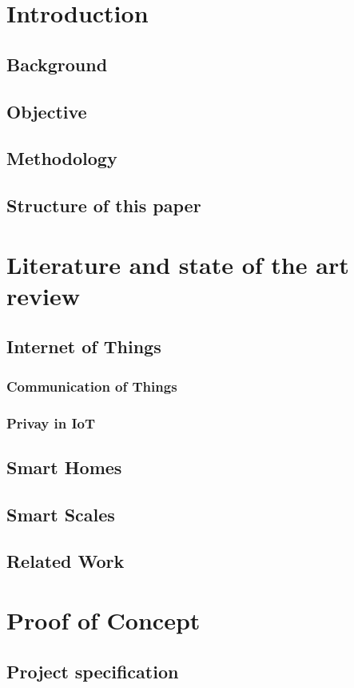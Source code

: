 \documentclass[
12pt,        %
openright,   %
twoside,     %
a4paper,     %
brazil,       %
english       %
%
%
]{ppgca}
\begin{document}
\chapter{Introduction} %
\section{Background}
\section{Objective}
\section{Methodology}
\section{Structure of this paper}


\chapter{Literature and state of the art review}
\section{Internet of Things}
\subsection{Communication of Things}
\subsection{Privay in IoT}
\section{Smart Homes}
\section{Smart Scales}
\section{Related Work}


\chapter{Proof of Concept}
\section{Project specification}
\end{document}
